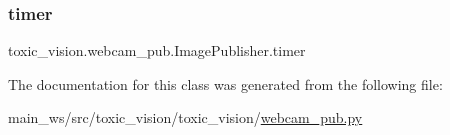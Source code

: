\mbox{\label{classtoxic__vision_1_1webcam__pub_1_1ImagePublisher_a278015e0d7ea896193603a3ad5400b56}} 
\subsubsection{\texorpdfstring{timer}{timer}}
{\footnotesize\ttfamily toxic\+\_\+vision.\+webcam\+\_\+pub.\+Image\+Publisher.\+timer}



The documentation for this class was generated from the following file\+:\begin{DoxyCompactItemize}
\item 
main\+\_\+ws/src/toxic\+\_\+vision/toxic\+\_\+vision/\mbox{\hyperlink{webcam__pub_8py}{webcam\+\_\+pub.\+py}}\end{DoxyCompactItemize}
